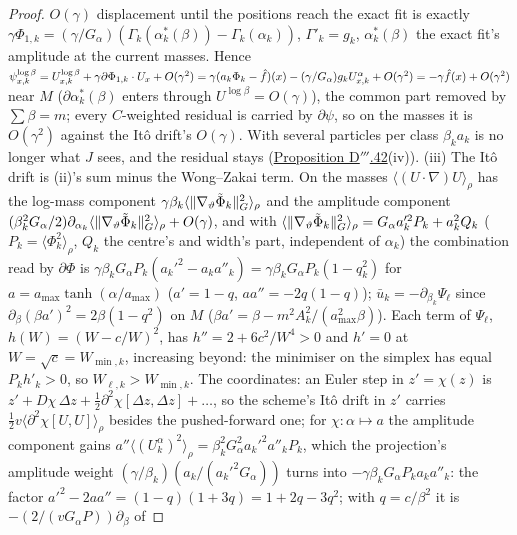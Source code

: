 \begin{proof}
$O(\gamma)$ displacement until the positions reach the exact fit is exactly
$\gamma\Phi_{1,k} = (\gamma/G_\alpha)(\Gamma_k(\alpha_k^*(\beta)) - \Gamma_k(\alpha_k))$, $\Gamma'_k = g_k$,
$\alpha_k^*(\beta)$ the exact fit's amplitude at the current masses. Hence
$\psi^{\log\beta}_{x,k} = U^{\log\beta}_{x,k} + \gamma\partial\Phi_{1,k}\cdot U_x + O(\gamma^2)
= \gamma(a_k\Phi_k - \hat f)(x) - (\gamma/G_\alpha)g_kU^\alpha_{x,k} + O(\gamma^2) = -\gamma\hat f(x) + O(\gamma^2)$ near $M$
($\partial\alpha_k^*(\beta)$ enters through $U^{\log\beta} = O(\gamma)$), the common part removed by $\sum\beta = m$;
every $C$-weighted residual is carried by $\partial\psi$, so on the masses it is $O(\gamma^2)$ against the It\^o
drift's $O(\gamma)$. With several particles per class $\beta_ka_k$ is no longer what $J$ sees, and the residual stays
(\hyperref[res:thmDppp:42]{Proposition D$'''$.42}(iv)). (iii) The It\^o drift is (ii)'s sum minus the Wong--Zakai term.
On the masses $\langle(U\cdot\nabla)U\rangle_\rho$ has the log-mass component
$\gamma\beta_k\langle\lVert \nabla_\vartheta\tilde\Phi_k\rVert^2_G\rangle_\rho$ and the amplitude component
$(\beta_k^2G_\alpha/2)\partial_{\alpha_k}\langle\lVert \nabla_\vartheta\tilde\Phi_k\rVert^2_G\rangle_\rho + O(\gamma)$, and with
$\langle\lVert \nabla_\vartheta\tilde\Phi_k\rVert^2_G\rangle_\rho = G_\alpha a_k'^2P_k + a_k^2Q_k$
($P_k = \langle\Phi_k^2\rangle_\rho$, $Q_k$ the centre's and width's part, independent of $\alpha_k$) the combination read
by $\partial\Phi$ is $\gamma\beta_kG_\alpha P_k(a_k'^2 - a_ka''_k) = \gamma\beta_kG_\alpha P_k(1 - q_k^2)$ for
$a = a_{\max}\tanh(\alpha/a_{\max})$ ($a' = 1 - q$, $aa'' = -2q(1 - q)$); $\bar u_k = -\partial_{\beta_k}\Psi_\ell$ since
$\partial_\beta(\beta a')^2 = 2\beta(1 - q^2)$ on $M$ ($\beta a' = \beta - m^2A_k^2/(a_{\max}^2\beta)$). Each term of
$\Psi_\ell$, $h(W) = (W - c/W)^2$, has $h'' = 2 + 6c^2/W^4 > 0$ and $h' = 0$ at $W = \sqrt c = W_{\min,k}$, increasing
beyond: the minimiser on the simplex has equal $P_kh'_k > 0$, so $W_{\ell,k} > W_{\min,k}$. The coordinates: an Euler
step in $z' = \chi(z)$ is $z' + D\chi\,\Delta z + \tfrac12\partial^2\chi[\Delta z,\Delta z] + \dots$, so the scheme's
It\^o drift in $z'$ carries $\tfrac12v\langle\partial^2\chi[U,U]\rangle_\rho$ besides the pushed-forward one; for
$\chi\colon\alpha\mapsto a$ the amplitude component gains
$a''\langle(U^\alpha_k)^2\rangle_\rho = \beta_k^2G_\alpha^2a_k'^2a''_kP_k$, which the projection's amplitude weight
$(\gamma/\beta_k)(a_k/(a_k'^2G_\alpha))$ turns into $-\gamma\beta_kG_\alpha P_ka_ka''_k$: the factor
$a'^2 - 2aa'' = (1 - q)(1 + 3q) = 1 + 2q - 3q^2$; with $q = c/\beta^2$ it is $-(2/(vG_\alpha P))\partial_\beta$ of

\end{proof}
